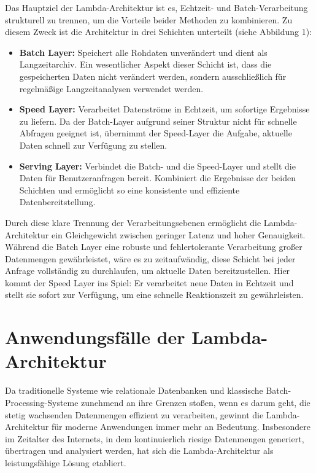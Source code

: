 Das Hauptziel der Lambda-Architektur ist es, Echtzeit- und Batch-Verarbeitung strukturell zu trennen, um die Vorteile beider Methoden zu kombinieren. Zu diesem Zweck ist die Architektur in drei Schichten unterteilt (siehe Abbildung 1):

\begin{itemize}
	\item \textbf{Batch Layer:} Speichert alle Rohdaten unverändert und dient als Langzeitarchiv. Ein wesentlicher Aspekt dieser Schicht ist, dass die gespeicherten Daten nicht verändert werden, sondern ausschließlich für regelmäßige Langzeitanalysen verwendet werden.
	\item \textbf{Speed Layer:} Verarbeitet Datenströme in Echtzeit, um sofortige Ergebnisse zu liefern. Da der Batch-Layer aufgrund seiner Struktur nicht für schnelle Abfragen geeignet ist, übernimmt der Speed-Layer die Aufgabe, aktuelle Daten schnell zur Verfügung zu stellen.
	\item \textbf{Serving Layer:} Verbindet die Batch- und die Speed-Layer und stellt die Daten für Benutzeranfragen bereit. Kombiniert die Ergebnisse der beiden Schichten und ermöglicht so eine konsistente und effiziente Datenbereitstellung.
\end{itemize}

Durch diese klare Trennung der Verarbeitungsebenen ermöglicht die Lambda-Architektur ein Gleichgewicht zwischen geringer Latenz und hoher Genauigkeit. Während die Batch Layer eine robuste und fehlertolerante Verarbeitung großer Datenmengen gewährleistet, wäre es zu zeitaufwändig, diese Schicht bei jeder Anfrage vollständig zu durchlaufen, um aktuelle Daten bereitzustellen. Hier kommt der Speed Layer ins Spiel: Er verarbeitet neue Daten in Echtzeit und stellt sie sofort zur Verfügung, um eine schnelle Reaktionszeit zu gewährleisten.

\section{Anwendungsfälle der Lambda-Architektur}
Da traditionelle Systeme wie relationale Datenbanken und klassische Batch-Processing-Systeme zunehmend an ihre Grenzen stoßen, wenn es darum geht, die stetig wachsenden Datenmengen effizient zu verarbeiten, gewinnt die Lambda-Architektur für moderne Anwendungen immer mehr an Bedeutung. Insbesondere im Zeitalter des Internets, in dem kontinuierlich riesige Datenmengen generiert, übertragen und analysiert werden, hat sich die Lambda-Architektur als leistungsfähige Lösung etabliert.

